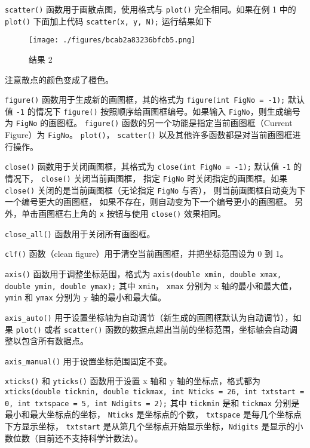 \verb|scatter()| 函数用于画散点图，使用格式与 \verb|plot()| 完全相同。如果在例 1 中的 \verb|plot()| 下面加上代码
\verb|scatter(x, y, N);|
运行结果如下

\begin{figure}[ht]
\centering
\texttt{[image: ./figures/bcab2a83236bfcb5.png]}
\caption{结果 2} \label{fig_MtPlot_4}
\end{figure}

注意散点的颜色变成了橙色。

\verb|figure()| 函数用于生成新的画图框，其的格式为
\verb|figure(int FigNo = -1);|
默认值 \verb|-1| 的情况下 \verb|figure()| 按照顺序给画图框编号。如果输入 \verb|FigNo|，则生成编号为 \verb|FigNo| 的画图框。 \verb|figure()| 函数的另一个功能是指定当前画图框（Current Figure）为 \verb|FigNo|。 \verb|plot()|， \verb|scatter()| 以及其他许多函数都是对当前画图框进行操作。

\verb|close()| 函数用于关闭画图框，其格式为
\verb|close(int FigNo = -1);|
默认值 \verb|-1| 的情况下， \verb|close()| 关闭当前画图框， 指定 \verb|FigNo| 时关闭指定的画图框。如果 \verb|close()| 关闭的是当前画图框（无论指定 \verb|FigNo| 与否）， 则当前画图框自动变为下一个编号更大的画图框， 如果不存在，则自动变为下一个编号更小的画图框。 另外，单击画图框右上角的 \verb|x| 按钮与使用 \verb|close()| 效果相同。

\verb|close_all()| 函数用于关闭所有画图框。

\verb|clf()| 函数（clean figure）用于清空当前画图框，并把坐标范围设为 0 到 1。

\verb|axis()| 函数用于调整坐标范围，格式为
\verb|axis(double xmin, double xmax, double ymin, double ymax);|
其中 \verb|xmin|， \verb|xmax| 分别为 x 轴的最小和最大值， \verb|ymin| 和 \verb|ymax| 分别为 y 轴的最小和最大值。

\verb|axis_auto()| 用于设置坐标轴为自动调节（新生成的画图框默认为自动调节），如果 \verb|plot()| 或者 \verb|scatter()| 函数的数据点超出当前的坐标范围，坐标轴会自动调整以包含所有数据点。

\verb|axis_manual()| 用于设置坐标范围固定不变。

\verb|xticks()| 和 \verb|yticks()| 函数用于设置 x 轴和 y 轴的坐标点，格式都为
\verb|xticks(double tickmin, double tickmax, int Nticks = 26, int txtstart = 0, int txtspace = 5, int Ndigits = 2);|
其中 \verb|tickmin| 是和 \verb|tickmax| 分别是最小和最大坐标点的坐标， \verb|Nticks| 是坐标点的个数， \verb|txtspace| 是每几个坐标点下方显示坐标， \verb|txtstart| 是从第几个坐标点开始显示坐标，\verb|Ndigits| 是显示的小数位数（目前还不支持科学计数法）。

